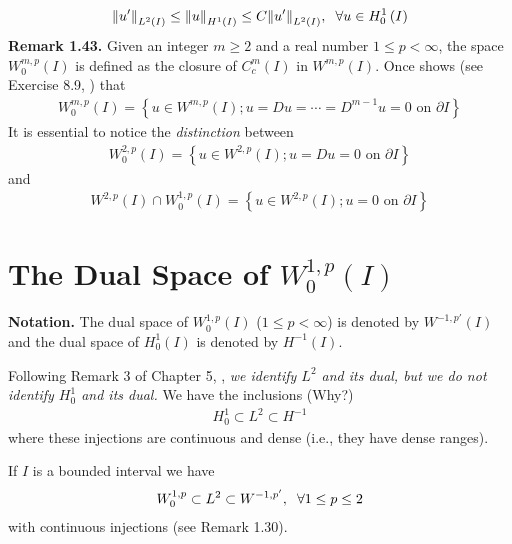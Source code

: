 \documentclass[a4paper,oneside]{article}
\numberwithin{equation}{section}
\begin{document}
\begin{align}
{\left\| {u'} \right\|_{{L^2}\left( I \right)}} \le {\left\| u \right\|_{{H^1}\left( I \right)}} \le C{\left\| {u'} \right\|_{{L^2}\left( I \right)}},\hspace{0.2cm}\forall u \in H_0^1\left( I \right)
\end{align}
\textbf{Remark 1.43.} Given an integer $m\ge 2$ and a real number $1\le p<\infty$, the space $W_0^{m,p}\left(I\right)$ is defined as the closure of $C_c^m\left(I\right)$ in $W^{m,p}\left(I\right)$. Once shows (see Exercise 8.9, \cite{1}) that
\begin{align}
W_0^{m,p}\left( I \right) = \left\{ {u \in {W^{m,p}}\left( I \right);u = Du =  \cdots  = {D^{m - 1}}u = 0\mbox{ on } \partial I} \right\}
\end{align}
It is essential to notice the \textit{distinction} between
\begin{align}
W_0^{2,p}\left( I \right) = \left\{ {u \in {W^{2,p}}\left( I \right);u = Du = 0\mbox{ on } \partial I} \right\}
\end{align}
and
\begin{align}
{W^{2,p}}\left( I \right) \cap W_0^{1,p}\left( I \right) = \left\{ {u \in {W^{2,p}}\left( I \right);u = 0\mbox{ on } \partial I} \right\}
\end{align}
\section*{The Dual Space of $W_0^{1,p}\left(I\right)$}
\textbf{Notation.} The dual space of $W_0^{1,p}\left(I\right)$ ($1\le p<\infty$) is denoted by ${W^{ - 1,p'}}\left( I \right)$ and the dual space of $H_0^1\left(I\right)$ is denoted by $H^{-1}\left(I\right)$. 

Following Remark 3 of Chapter 5, \cite{1}, \textit{we identify $L^2$ and its dual, but we do not identify $H_0^1$ and its dual.} We have the inclusions (Why?)
\begin{align}
H_0^1 \subset {L^2} \subset {H^{ - 1}}
\end{align}
where these injections are continuous and dense (i.e., they have dense ranges). 

If $I$ is a bounded interval we have
\begin{align}
W_0^{1,p} \subset {L^2} \subset {W^{ - 1,p'}},\hspace{0.2cm}\forall 1 \le p \le 2
\end{align}
with continuous injections (see Remark 1.30).
\end{document}
